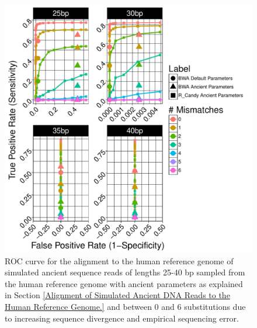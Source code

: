 \documentclass[11pt,a4paper]{report}
\begin{document}
\begin{figure}[H]
\centering
\includegraphics[width=12cm]{pictures/f_DS4_ART.pdf}
\caption{
ROC curve for the alignment to the human reference genome of simulated ancient 
sequence reads of lengths 25-40 bp sampled from the human reference genome with 
ancient parameters as explained in Section 
\ref{Alignment of Simulated Ancient DNA Reads to the Human Reference Genome.}
and between 0 and 6 substitutions due to increasing sequence divergence and
empirical sequencing error.
}
\label{DS4_ART}
\end{figure}





\end{document}
